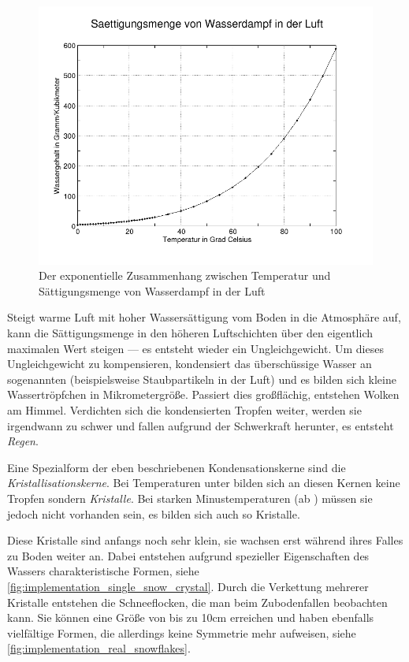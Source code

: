 \begin{figure}[ht]
\centering
\includegraphics[width=15cm]{images/moist_air}
\caption{Der exponentielle Zusammenhang zwischen Temperatur und Sättigungsmenge von Wasserdampf in der Luft\cite{wiki:Saettigung}}
\label{fig:implementation_moist_air}
\end{figure}

Steigt warme Luft mit hoher Wassersättigung vom Boden in die
Atmosphäre auf, kann die Sättigungsmenge in den höheren Luftschichten
über den eigentlich maximalen Wert steigen --- es entsteht wieder ein
Ungleichgewicht. Um dieses Ungleichgewicht zu kompensieren, kondensiert
das überschüssige Wasser an sogenannten
 (beispielsweise Staubpartikeln in
der Luft) und es bilden sich kleine Wassertröpfchen in
Mikrometergröße. Passiert dies großflächig, entstehen Wolken am
Himmel. Verdichten sich die kondensierten Tropfen weiter, werden sie
irgendwann zu schwer und fallen aufgrund der Schwerkraft herunter, es
entsteht \emph{Regen}.

Eine Spezialform der eben beschriebenen Kondensationskerne sind die
\emph{Kristallisationskerne}. Bei Temperaturen unter 
bilden sich an diesen Kernen keine Tropfen sondern \emph{Kristalle}.
Bei starken Minustemperaturen (ab ) müssen sie
jedoch nicht vorhanden sein, es bilden sich auch so Kristalle.

Diese Kristalle sind anfangs noch sehr klein, sie wachsen erst während ihres
Falles zu Boden weiter an. Dabei entstehen aufgrund spezieller
Eigenschaften des Wassers charakteristische Formen, siehe
\cref{fig:implementation_single_snow_crystal}. Durch die Verkettung
mehrerer Kristalle entstehen die Schneeflocken, die man beim
Zubodenfallen beobachten kann. Sie können eine Größe von bis zu 10cm
erreichen\cite{Nau96} und haben ebenfalls vielfältige Formen, die
allerdings keine Symmetrie mehr aufweisen, siehe
\cref{fig:implementation_real_snowflakes}.

